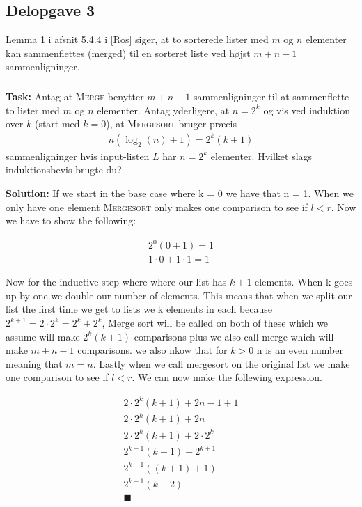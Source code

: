 \subsection{Delopgave 3}
Lemma 1 i afsnit 5.4.4 i [Ros] siger, at to sorterede lister med $m$ og $n$ elementer kan sammenflettes (merged) til en sorteret liste ved højst $m+n-1$ sammenligninger. 
\subsubsection{}
\textbf{Task:} Antag at \textsc{Merge} benytter $m+n-1$ sammenligninger til at sammenflette to lister med $m$ og $n$ elementer. Antag yderligere, at $n=2^k$ og vis ved induktion over $k$ (start med $k=0$), at \textsc{Mergesort} bruger præcis
	\begin{align*}
		n(\log_2(n)+1)=2^k(k+1)
	\end{align*}
sammenligninger hvis input-listen $L$ har $n=2^k$ elementer. Hvilket slags induktionsbevis brugte du?

\bigskip
\noindent
\textbf{Solution:} If we start in the base case where k = 0 we have that n = 1. When we only have one element \textsc{Mergesort} only makes one comparison to see if $l<r$. Now we have to show the following: 

\begin{equation}
    \begin{aligned}
        2^0(0+1)=1\\
        1\cdot0+1\cdot1=1
    \end{aligned}
\end{equation}

\noindent
Now for the inductive step where where our list has $k+1$ elements. When k goes up by one we double our number of elements. This means that when we split our list the first time we get to lists we k elements in each because $2^{k+1}=2\cdot2^k=2^k+2^k$, Merge sort will be called on both of these which we assume will make $2^k(k+1)$ comparisons plus we also call merge which will make $m+n-1$ comparisons. we also nkow that for $k>0$ n is an even number meaning that $m=n$. Lastly when we call mergesort on the original list we make one comparison to see if $l<r$. We can now make the follewing expression.

\begin{equation}
    \begin{aligned}
        2\cdot2^k(k+1)+2n-1+1\\
        2\cdot2^k(k+1)+2n\\
        2\cdot2^k(k+1)+2\cdot2^k\\
        2^{k+1}(k+1)+2^{k+1}\\
        2^{k+1}((k+1)+1)\\
        2^{k+1}(k+2)\\
        \blacksquare
    \end{aligned}
\end{equation}

